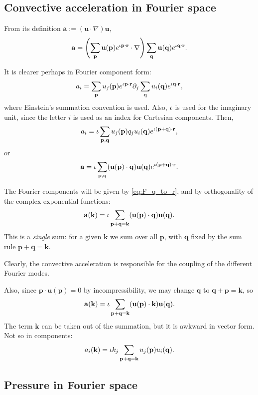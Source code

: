 \subsection{Convective acceleration in Fourier space}

From its definition \(
\mathbf{a} := (\mathbf{u}\cdot\nabla)\mathbf{u} ,
\)
%
\[
\mathbf{a} = 
\left(
\sum_\mathbf{p} \mathbf{u}(\mathbf{p} ) e^{\iota \mathbf{p}\cdot\mathbf{r}} 
\cdot\nabla
\right)
\sum_\mathbf{q} \mathbf{u}(\mathbf{q} ) e^{\iota \mathbf{q}\cdot\mathbf{r}} .
\]

It is clearer perhaps in Fourier component form:
\[
a_i = 
\sum_\mathbf{p} u_j(\mathbf{p} )  e^{\iota \mathbf{p}\cdot\mathbf{r}} 
\partial_j
\sum_\mathbf{q} u_i(\mathbf{q} ) e^{\iota \mathbf{q}\cdot\mathbf{r}} ,
\]
where Einstein's summation convention is used. Also, $\iota$ is used
for the imaginary unit, since the letter $i$ is used as an index for
Cartesian components. Then,
\[
a_i = \iota
\sum_{ \mathbf{p}, \mathbf{q}}
u_j(\mathbf{p} )
q_j
u_i(\mathbf{q} )
e^{\iota ( \mathbf{p}  +  \mathbf{q} ) \cdot\mathbf{r}} ,
\]
or
\[
\mathbf{a} = \iota
\sum_{ \mathbf{p}, \mathbf{q}}
(\mathbf{u}(\mathbf{p} )
\cdot
\mathbf{q})
\mathbf{u}(\mathbf{q} )
e^{\iota ( \mathbf{p}  +  \mathbf{q} ) \cdot\mathbf{r}} .
\]

The Fourier components will be given by \eqref{eq:F_q_to_r}, and by orthogonality of the
complex exponential functions:
\[
\mathbf{a}(\mathbf{k})= \iota
\sum_{ \mathbf{p} + \mathbf{q} = \mathbf{k}}
(\mathbf{u}(\mathbf{p} )
\cdot
\mathbf{q})
\mathbf{u}(\mathbf{q} ) .
\]
This is a \emph{single} sum: for a given $\mathbf{k}$ we sum over all $\mathbf{p}$,
with $\mathbf{q}$ fixed by the sum rule $\mathbf{p} + \mathbf{q} = \mathbf{k}$.

Clearly, the convective acceleration is responsible for the coupling of the different Fourier modes.


Also, since $\mathbf{p} \cdot \mathbf{u}(\mathbf{p}) = 0$ by incompressibility, we
may change $\mathbf{q}$ to $\mathbf{q} + \mathbf{p} = \mathbf{k} $,
so
\[
\mathbf{a}(\mathbf{k})=\iota
\sum_{ \mathbf{p} + \mathbf{q} = \mathbf{k}}
(\mathbf{u}(\mathbf{p} )
\cdot
\mathbf{k})
\mathbf{u}(\mathbf{q} ).
\]
The term $\mathbf{k}$ can be taken out of the summation, but it is awkward in vector form. Not so in components:
\[
a_i(\mathbf{k})=\iota
k_j
\sum_{ \mathbf{p} + \mathbf{q} = \mathbf{k}}
u_j (\mathbf{p} )
u_i(\mathbf{q} ) .
\]



\subsection{Pressure in Fourier space}

